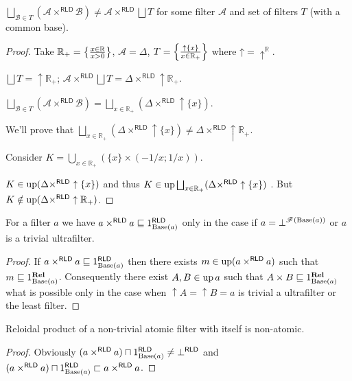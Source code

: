 \begin{example}
$\bigsqcup_{\mathcal{B}\in T}(\mathcal{A}\times^{\mathsf{RLD}}\mathcal{B})\ne\mathcal{A}\times^{\mathsf{RLD}}\bigsqcup T$
for some filter $\mathcal{A}$ and set of filters $T$ (with a common
base).\end{example}
\begin{proof}
Take $\mathbb{R}_{+}=\left\{ \frac{x\in\mathbb{R}}{x>0}\right\}$, $\mathcal{A}=\Delta$,
$T=\left\{ \frac{\uparrow\{x\}}{x\in\mathbb{R}_{+}}\right\}$ where $\mathord\uparrow=\mathord{\uparrow^{\mathbb{R}}}$.

$\bigsqcup T=\uparrow\mathbb{R}_{+}$; $\mathcal{A}\times^{\mathsf{RLD}}\bigsqcup T=\Delta\times^{\mathsf{RLD}}\uparrow\mathbb{R}_{+}$.

$\bigsqcup_{\mathcal{B}\in T}(\mathcal{A}\times^{\mathsf{RLD}}\mathcal{B})=\bigsqcup_{x\in\mathbb{R}_{+}}(\Delta\times^{\mathsf{RLD}}\uparrow\{x\})$.

We'll prove that $\bigsqcup_{x\in\mathbb{R}_{+}}(\Delta\times^{\mathsf{RLD}}\uparrow\{x\})\ne\Delta\times^{\mathsf{RLD}}\uparrow\mathbb{R}_{+}$.

Consider $K=\bigcup_{x\in\mathbb{R}_{+}}(\{x\}\times(-1/x;1/x))$.

$K\in\operatorname{up}(\Delta\times^{\mathsf{RLD}}\uparrow\{x\})$ and thus $K\in\operatorname{up}\bigsqcup_{x\in\mathbb{R}_{+}}(\Delta\times^{\mathsf{RLD}}\uparrow\{x\})$
. But $K\notin\operatorname{up}(\Delta\times^{\mathsf{RLD}}\uparrow\mathbb{R}_{+})$.\end{proof}
\begin{thm}
For a filter $a$ we have $a\times^{\mathsf{RLD}}a\sqsubseteq1_{\operatorname{Base}(a)}^{\mathsf{RLD}}$
only in the case if $a=\bot^{\mathscr{F}(\operatorname{Base}(a))}$ or $a$ is a
trivial ultrafilter.\end{thm}
\begin{proof}
If $a\times^{\mathsf{RLD}}a\sqsubseteq1_{\operatorname{Base}(a)}^{\mathsf{RLD}}$
then there exists $m\in\operatorname{up}(a\times^{\mathsf{RLD}}a)$ such that $m\sqsubseteq1_{\operatorname{Base}(a)}^{\mathbf{Rel}}$.
Consequently there exist $A,B\in\operatorname{up} a$ such that $A\times B\sqsubseteq1_{\operatorname{Base}(a)}^{\mathbf{Rel}}$
what is possible only in the case when $\uparrow A=\uparrow B=a$
is trivial a ultrafilter or the least filter.\end{proof}
\begin{cor}
Reloidal product of a non-trivial atomic filter with itself is non-atomic.\end{cor}
\begin{proof}
Obviously $(a\times^{\mathsf{RLD}}a)\sqcap1_{\operatorname{Base}(a)}^{\mathsf{RLD}}\ne\bot^{\mathsf{RLD}}$
and $(a\times^{\mathsf{RLD}}a)\sqcap1_{\operatorname{Base}(a)}^{\mathsf{RLD}}\sqsubset a\times^{\mathsf{RLD}}a$.\end{proof}
